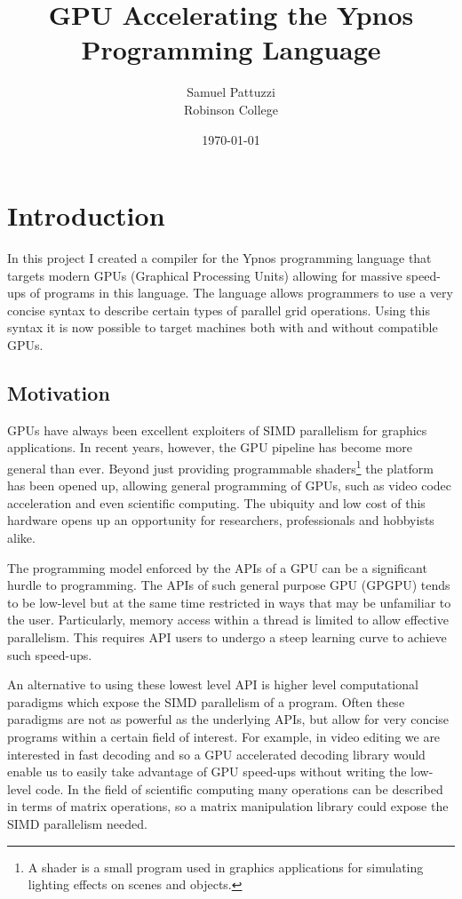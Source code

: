 \documentclass[12pt,a4paper,twoside]{scrbook}
\title{GPU Accelerating the Ypnos Programming Language}
\author{Samuel Pattuzzi\\ Robinson College}
\date{\today}
\begin{document}
\frontmatter



\listoftodos



\mainmatter
\chapter{Introduction}

In this project I created a compiler for the Ypnos programming language that
targets modern GPUs (Graphical Processing Units) allowing for massive speed-ups of programs in this
language. The language allows programmers to use a very concise syntax to
describe certain types of parallel grid operations. Using this syntax it is now
possible to target machines both with and without compatible GPUs.

\section{Motivation}

GPUs have always been excellent exploiters of SIMD parallelism for graphics
applications. In recent years, however, the GPU pipeline has become more general
than ever. Beyond just providing programmable shaders\footnote{A shader is a
  small program used in graphics applications for simulating lighting effects on
  scenes and objects.} the platform has been opened up, allowing general
programming of GPUs, such as video codec acceleration and even scientific
computing. The ubiquity and low cost of this hardware opens up an opportunity
for researchers, professionals and hobbyists alike.

The programming model enforced by the APIs of a GPU can be a significant hurdle
to programming. The APIs of such general purpose GPU (GPGPU) tends to be
low-level but at the same time restricted in ways that may be unfamiliar to the
user. Particularly, memory access within a thread is limited to allow effective
parallelism. This requires API users to undergo a steep learning curve to
achieve such speed-ups.

An alternative to using these lowest level API is higher level computational
paradigms which expose the SIMD parallelism of a program. Often these paradigms
are not as powerful as the underlying APIs, but allow for very concise programs
within a certain field of interest. For example, in video editing we are
interested in fast decoding and so a GPU accelerated decoding library would
enable us to easily take advantage of GPU speed-ups without writing the
low-level code. In the field of scientific computing many operations can be
described in terms of matrix operations, so a matrix manipulation library could
expose the SIMD parallelism needed.
\end{document}
